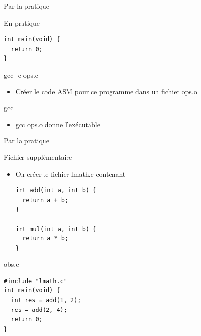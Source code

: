 \def\ftitle{Par la pratique}
\begin{frame}[containsverbatim]{\ftitle}
\def\blocktitle{En pratique}
\begin{block}{\blocktitle}
\begin{verbatim}
int main(void) {
  return 0;
}
\end{verbatim}
\end{block}

\def\blocktitle{gcc -c ops.c}
\begin{block}{\blocktitle}
\begin{itemize}
\item Créer le code ASM pour ce programme dans un fichier ops.o
\end{itemize}
\end{block}
\def\blocktitle{gcc }
\begin{block}{\blocktitle}
\begin{itemize}
\item gcc ops.o donne l'exécutable
\end{itemize}
\end{block}
\end{frame}


\begin{frame}[containsverbatim]{\ftitle}
\def\blocktitle{Fichier supplémentaire}
\begin{block}{\blocktitle}
\begin{itemize}
\item On créer le fichier lmath.c contenant
\begin{verbatim}
int add(int a, int b) {
  return a + b;
}

int mul(int a, int b) {
  return a * b;
}
\end{verbatim}
\end{itemize}
\end{block}
\def\blocktitle{obs.c}
\begin{block}{\blocktitle}
\begin{verbatim}
#include "lmath.c"
int main(void) {
  int res = add(1, 2);
  res = add(2, 4);
  return 0;
}
\end{verbatim}
\end{block}
\end{frame}


